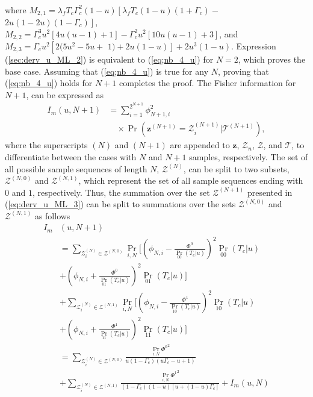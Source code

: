 \documentclass[11pt,draftclsnofoot,journal,onecolumn]{IEEEtran}
\begin{document}
\begin{IEEEproof}
\begin{align}
\label{sec:derv_u_ML_2}
\end{align}
where $M_{2,1}=\lambda_f T_c\Gamma_c^2(1 - u)\left[\lambda_f T_c(1 - u)(1+\Gamma_c)\right.-$ $\left.2u(1 - 2u)(1-\Gamma_c)\right]$, $M_{2,2}=\Gamma_c^3 u^2\left[4u(u - 1) + 1\right] - \Gamma_c^2 u^2\left[10u(u - 1) + 3\right]$, and $M_{2,3}=\Gamma_c u^2\left[2(5u^2 - 5u \right.+$ $\left. 1) + 2u(1 - u)\right] + 2u^3(1 - u)$. Expression (\ref{sec:derv_u_ML_2}) is equivalent to (\ref{eq;nb_4_u}) for $N=2$, which proves the base case. Assuming that (\ref{eq;nb_4_u}) is true for any $N$, proving that (\ref{eq;nb_4_u}) holds for $N+1$ completes the proof. The Fisher information for $N+1$, can be expressed as
\begin{align}
I_m\left(u,N+1\right) & = \sum_{i=1}^{2^{N+1}} \phi_{N+1,i}^2\nonumber\\&\quad\times \Pr(\boldsymbol{z}^{(N+1)} = \mathcal{Z}_i^{(N+1)}|\mathcal{T}^{(N+1)}),
\label{eq:derv_u_ML_3}
\end{align}
where the superscripts $(N)$ and $(N+1)$ are appended to $\boldsymbol{z}$, $\mathcal{Z}_n$, $\mathcal{Z}$, and $\mathcal{T}$, to differentiate between the cases with $N$ and $N+1$ samples, respectively. The set of all possible sample sequences of length $N$, $\mathcal{Z}^{(N)}$, can be split to two subsets, $\mathcal{Z}^{(N,0)}$ and $\mathcal{Z}^{(N,1)}$, which represent the set of all sample sequences ending with $0$ and $1$, respectively. Thus, the summation over the set $\mathcal{Z}^{(N+1)}$ presented in (\ref{eq:derv_u_ML_3}) can be split to summations over the sets $\mathcal{Z}^{(N,0)}$ and $\mathcal{Z}^{(N,1)}$ as follows
\begin{align}
I_m&(u, N\!\!+\!1)\! \nonumber\\&= \sum_{\mathcal{Z}_{i}^{(N)} \in \mathcal{Z}^{(N,0)}} \textstyle\Pr_{i,N}\bigg[\left(\phi_{N,i}-\frac{\Phi^0}{\textstyle\Pr_{00}(T_c|u)}\right)^2 \textstyle\Pr_{00}(T_c|u)\nonumber\\& + \left(\phi_{N,i}+\frac{\Phi^0}{\textstyle\Pr_{01}(T_c|u)}\right)^2 \textstyle\Pr_{01}(T_c|u)\bigg] \nonumber \\
& + \sum_{\mathcal{Z}_{i}^{(N)} \in \mathcal{Z}^{(N,1)}} \textstyle \Pr_{i,N} \bigg[\left(\phi_{N,i}-\frac{\Phi^1}{\textstyle\Pr_{10}(T_c|u)}\right)^2 \textstyle\Pr_{10}(T_c|u)\nonumber\\& + \left(\phi_{N,i}+\frac{\Phi^1}{\textstyle\Pr_{11}(T_c|u)}\right)^2 \textstyle\Pr_{11}(T_c|u)\bigg] \nonumber \\
& = \sum_{\mathcal{Z}_{i}^{(N)} \in \mathcal{Z}^{(N,0)}} \frac{\textstyle\Pr_{i,N}{\Phi^0}^2}{u\left(1-\Gamma_c\right)\left(u\Gamma_c-u+1\right)}\nonumber\\& + \sum_{\mathcal{Z}_{i}^{(N)} \in \mathcal{Z}^{(N,1)}} \frac{\textstyle\Pr_{i,N}{\Phi^1}^2}{(1 - \Gamma_c)(1 - u)\left[u + (1-u)\Gamma_c\right]}+I_m(u, N) \nonumber \\

\end{align}
\end{IEEEproof}
\end{document}
